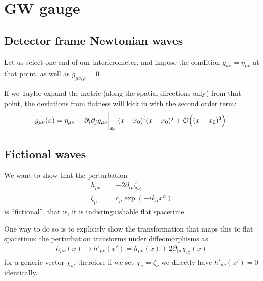 \documentclass[main.tex]{subfiles}
\begin{document}
\section{GW gauge}

\subsection{Detector frame Newtonian waves}

Let us select one end of our interferometer, and impose the condition \(g_{\mu \nu } = \eta_{\mu \nu }\) at that point, as well as \(g_{\mu \nu , \rho } = 0\). 

If we Taylor expand the metric (along the spatial directions only) from that point,
the deviations from flatness will kick in with the second order term: 
%
\begin{align}
g_{\mu \nu } (x) = \eta_{\mu \nu } + \eval{\partial_{i} \partial_{j} g_{\mu \nu }}_{x_0 } 
(x-x_0 )^{i}
(x-x_0 )^{j} + \order{(x-x_0 )^3}
\,.
\end{align}

\subsection{Fictional waves}

We want to show that the perturbation 
%
\begin{align}
h_{\mu \nu } &= - 2 \partial_{(\mu } \zeta_{\nu )}  \\
\zeta_{\mu } &= c_\mu \exp( - i k_\alpha x^{\alpha })
\,
\end{align}
%
is ``fictional'', that is, it is indistinguishable flat spacetime.

One way to do so is to explicitly show the transformation that maps this to flat spacetime: the perturbation transforms under diffeomorphisms as 
%
\begin{align}
h_{\mu \nu } (x) \to h'_{\mu \nu } (x') = h_{\mu \nu } (x) + 2 \partial_{(\mu } \chi_{\nu )} (x)
\,
\end{align}
%
for a generic vector \(\chi_{\nu }\), therefore if we set \(\chi _\nu = \zeta _\nu \) we directly have \(h'_{\mu \nu } (x') = 0\) identically.
\end{document}
